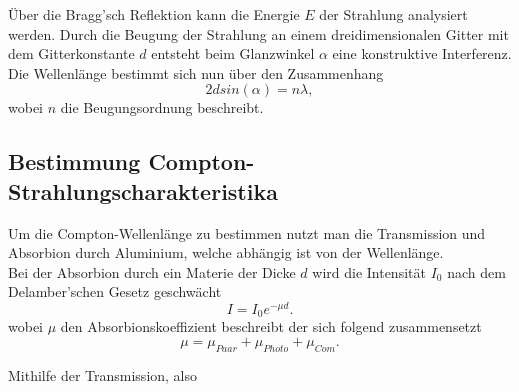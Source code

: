 Über die Bragg'sch Reflektion kann die Energie $E$ der Strahlung analysiert werden.
Durch die Beugung der Strahlung an einem dreidimensionalen Gitter mit dem Gitterkonstante $d$ 
entsteht beim Glanzwinkel $\alpha$ eine konstruktive Interferenz. Die Wellenlänge bestimmt 
sich nun über den Zusammenhang
\begin{equation}
    2 d sin(\alpha)=n \lambda,
\end{equation}
wobei $n$ die Beugungsordnung beschreibt.


\subsection{Bestimmung Compton-Strahlungscharakteristika}
Um die Compton-Wellenlänge zu bestimmen nutzt man die Transmission und Absorbion durch Aluminium, welche abhängig ist von 
der Wellenlänge.\\
Bei der Absorbion durch ein Materie der Dicke $d$ wird die Intensität $I_0$ nach dem Delamber'schen Gesetz geschwächt
\begin{equation}
    I=I_0e^{-\mu d}.
\end{equation}
wobei $\mu$ den Absorbionskoeffizient beschreibt der sich folgend zusammensetzt
\begin{equation}
    \mu =\mu_{Paar}+\mu_{Photo}+\mu_{Com}.
\end{equation}
\newline

Mithilfe der Transmission, also